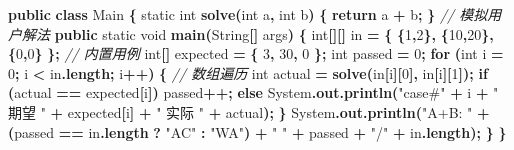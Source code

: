 \documentclass[
  11pt,
]{ctexart}
\newenvironment{Shaded}{\begin{snugshade}}{\end{snugshade}}
\newcommand{\BuiltInTok}[1]{#1}
\newcommand{\CommentTok}[1]{\textcolor[rgb]{0.56,0.35,0.01}{\textit{#1}}}
\newcommand{\ControlFlowTok}[1]{\textcolor[rgb]{0.13,0.29,0.53}{\textbf{#1}}}
\newcommand{\DataTypeTok}[1]{\textcolor[rgb]{0.13,0.29,0.53}{#1}}
\newcommand{\DecValTok}[1]{\textcolor[rgb]{0.00,0.00,0.81}{#1}}
\newcommand{\FunctionTok}[1]{\textcolor[rgb]{0.13,0.29,0.53}{\textbf{#1}}}
\newcommand{\KeywordTok}[1]{\textcolor[rgb]{0.13,0.29,0.53}{\textbf{#1}}}
\newcommand{\NormalTok}[1]{#1}
\newcommand{\OperatorTok}[1]{\textcolor[rgb]{0.81,0.36,0.00}{\textbf{#1}}}
\newcommand{\StringTok}[1]{\textcolor[rgb]{0.31,0.60,0.02}{#1}}
\begin{document}
\begin{Shaded}
\begin{Highlighting}[]
\KeywordTok{public} \KeywordTok{class}\NormalTok{ Main }\OperatorTok{\{}
    \DataTypeTok{static} \DataTypeTok{int} \FunctionTok{solve}\OperatorTok{(}\DataTypeTok{int}\NormalTok{ a}\OperatorTok{,} \DataTypeTok{int}\NormalTok{ b}\OperatorTok{)} \OperatorTok{\{} \ControlFlowTok{return}\NormalTok{ a }\OperatorTok{+}\NormalTok{ b}\OperatorTok{;} \OperatorTok{\}}          \CommentTok{// 模拟用户解法}
    \KeywordTok{public} \DataTypeTok{static} \DataTypeTok{void} \FunctionTok{main}\OperatorTok{(}\BuiltInTok{String}\OperatorTok{[]}\NormalTok{ args}\OperatorTok{)} \OperatorTok{\{}
        \DataTypeTok{int}\OperatorTok{[][]}\NormalTok{ in }\OperatorTok{=} \OperatorTok{\{} \OperatorTok{\{}\DecValTok{1}\OperatorTok{,}\DecValTok{2}\OperatorTok{\},} \OperatorTok{\{}\DecValTok{10}\OperatorTok{,}\DecValTok{20}\OperatorTok{\},} \OperatorTok{\{}\DecValTok{0}\OperatorTok{,}\DecValTok{0}\OperatorTok{\}} \OperatorTok{\};}               \CommentTok{// 内置用例}
        \DataTypeTok{int}\OperatorTok{[]}\NormalTok{ expected }\OperatorTok{=} \OperatorTok{\{} \DecValTok{3}\OperatorTok{,} \DecValTok{30}\OperatorTok{,} \DecValTok{0} \OperatorTok{\};}
        \DataTypeTok{int}\NormalTok{ passed }\OperatorTok{=} \DecValTok{0}\OperatorTok{;}
        \ControlFlowTok{for} \OperatorTok{(}\DataTypeTok{int}\NormalTok{ i }\OperatorTok{=} \DecValTok{0}\OperatorTok{;}\NormalTok{ i }\OperatorTok{\textless{}}\NormalTok{ in}\OperatorTok{.}\FunctionTok{length}\OperatorTok{;}\NormalTok{ i}\OperatorTok{++)} \OperatorTok{\{}                 \CommentTok{// 数组遍历}
            \DataTypeTok{int}\NormalTok{ actual }\OperatorTok{=} \FunctionTok{solve}\OperatorTok{(}\NormalTok{in}\OperatorTok{[}\NormalTok{i}\OperatorTok{][}\DecValTok{0}\OperatorTok{],}\NormalTok{ in}\OperatorTok{[}\NormalTok{i}\OperatorTok{][}\DecValTok{1}\OperatorTok{]);}
            \ControlFlowTok{if} \OperatorTok{(}\NormalTok{actual }\OperatorTok{==}\NormalTok{ expected}\OperatorTok{[}\NormalTok{i}\OperatorTok{])}\NormalTok{ passed}\OperatorTok{++;}
            \ControlFlowTok{else} \BuiltInTok{System}\OperatorTok{.}\FunctionTok{out}\OperatorTok{.}\FunctionTok{println}\OperatorTok{(}\StringTok{"case\#"} \OperatorTok{+}\NormalTok{ i }\OperatorTok{+} \StringTok{" 期望 "} \OperatorTok{+}\NormalTok{ expected}\OperatorTok{[}\NormalTok{i}\OperatorTok{]} \OperatorTok{+} \StringTok{" 实际 "} \OperatorTok{+}\NormalTok{ actual}\OperatorTok{);}
        \OperatorTok{\}}
        \BuiltInTok{System}\OperatorTok{.}\FunctionTok{out}\OperatorTok{.}\FunctionTok{println}\OperatorTok{(}\StringTok{"A+B: "} \OperatorTok{+} \OperatorTok{(}\NormalTok{passed }\OperatorTok{==}\NormalTok{ in}\OperatorTok{.}\FunctionTok{length} \OperatorTok{?} \StringTok{"AC"} \OperatorTok{:} \StringTok{"WA"}\OperatorTok{)} \OperatorTok{+} \StringTok{" "} \OperatorTok{+}\NormalTok{ passed }\OperatorTok{+} \StringTok{"/"} \OperatorTok{+}\NormalTok{ in}\OperatorTok{.}\FunctionTok{length}\OperatorTok{);}
    \OperatorTok{\}}
\OperatorTok{\}}
\end{Highlighting}
\end{Shaded}
\end{document}
